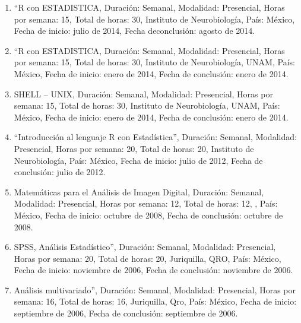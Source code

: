 \begin{enumerate}
\item “R con ESTADISTICA, Duración: Semanal, Modalidad: Presencial, Horas por semana: 15, Total de horas: 30, 
Instituto de Neurobiología, País: México, Fecha de inicio: julio de 2014, Fecha deconclusión: agosto de 2014.

\item “R con ESTADISTICA, Duración: Semanal, Modalidad: Presencial, Horas por semana: 15, Total de horas: 30, 
Instituto de Neurobiología, UNAM, País: México, Fecha de inicio: enero de 2014, Fecha de conclusión: enero de 
2014.

\item SHELL – UNIX, Duración: Semanal, Modalidad: Presencial, Horas por semana: 15, Total de horas: 30, 
Instituto de 
Neurobiología, UNAM, País: México, Fecha de inicio: enero de 2014, Fecha de conclusión: enero de 2014.

\item “Introducción al lenguaje R con Estadística”, Duración: Semanal, Modalidad: Presencial, Horas por 
semana: 20, 
Total de horas: 20, Instituto de Neurobiología, País: México, Fecha de inicio: julio de 2012, Fecha de 
conclusión: julio de 2012.

\item Matemáticas para el Análisis de Imagen Digital, Duración: Semanal, Modalidad: Presencial, Horas por 
semana: 
12, Total de horas: 12, , País: México, Fecha de inicio: octubre de 2008, Fecha de conclusión: octubre de 
2008.

\item SPSS, Análisis Estadístico”, Duración: Semanal, Modalidad: Presencial, Horas por semana: 20, Total de 
horas: 
20, Juriquilla, QRO, País: México, Fecha de inicio: noviembre de 2006, Fecha de conclusión: noviembre de 2006.

\item Análisis multivariado”, Duración: Semanal, Modalidad: Presencial, Horas por semana: 16, Total de horas: 
16, 
Juriquilla, Qro, País: México, Fecha de inicio: septiembre de 2006, Fecha de conclusión: septiembre de 2006.

\end{enumerate}


